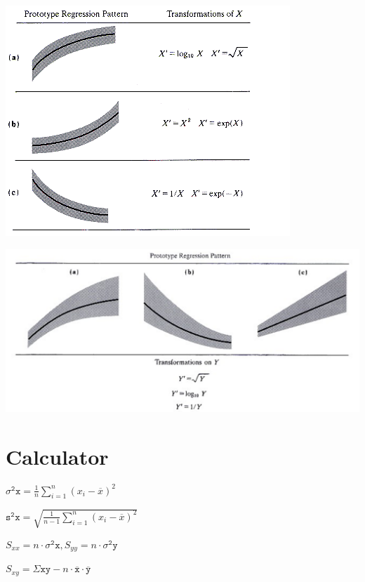 \documentclass[9pt,landscape]{article}
\begin{document}
\begin{multicols}{3}
\includegraphics[width=\columnwidth]{imgs/trans1}

\includegraphics[width=\columnwidth]{imgs/trans2}

\section{Calculator}

$\mathtt{\sigma^2x}=\frac{1}{n}\sum_{i=1}^{n}(x_i-\overline{x})^2$

$\mathtt{s^2x}=\sqrt{\frac{1}{n-1}\sum_{i=1}^{n}(x_i-\overline{x})^2}$

$S_{xx}=n\cdot \mathtt{\sigma^2x}, S_{yy} = n\cdot \mathtt{\sigma^2y}$

$S_{xy} = \Sigma\mathtt{xy} - n\cdot\mathtt{\overline{x}}\cdot\mathtt{\overline{y}}$

\end{multicols}
\end{document}
